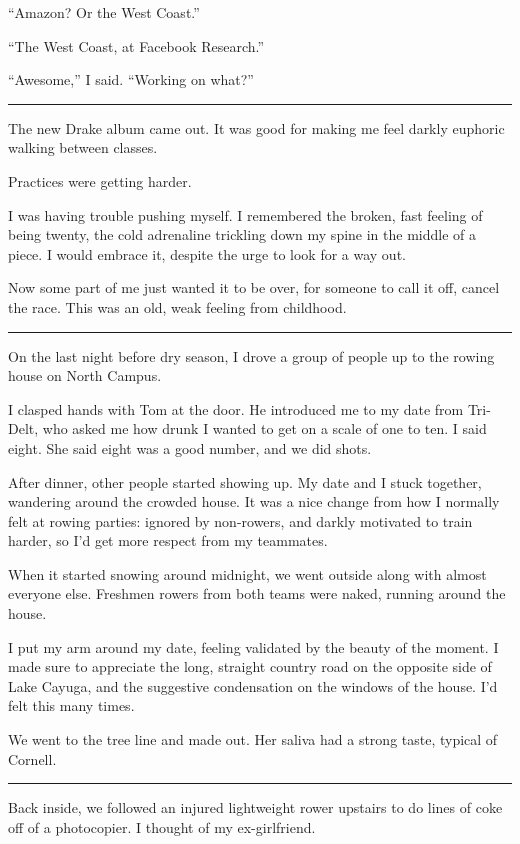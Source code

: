 ``Amazon?  Or the West Coast.''

``The West Coast, at Facebook Research.''

``Awesome,'' I said.  ``Working on what?''

\plainfancybreak{12pt}{2}{}

The new Drake album came out.  It was good for making me feel darkly euphoric
walking between classes.

Practices were getting harder.

I was having trouble pushing myself.  I remembered the broken, fast feeling of
being twenty, the cold adrenaline trickling down my spine in the middle of a
piece.  I would embrace it, despite the urge to look for a way out.  

Now some part of me just wanted it to be over, for someone to call it off,
cancel the race.  This was an old, weak feeling from childhood. 

\plainfancybreak{12pt}{2}{}

On the last night before dry season, I drove a group of people up to the rowing
house on North Campus.

I clasped hands with Tom at the door.  He introduced me to my date from
Tri-Delt, who asked me how drunk I wanted to get on a scale of one to ten. I
said eight.  She said eight was a good number, and we did shots.  

After dinner, other people started showing up.  My date and I stuck together,
wandering around the crowded house.  It was a nice change from how I normally
felt at rowing parties: ignored by non-rowers, and darkly motivated to train
harder, so I'd get more respect from my teammates.

When it started snowing around midnight, we went outside along with almost
everyone else.  Freshmen rowers from both teams were naked, running around the
house.

I put my arm around my date, feeling validated by the beauty of the moment.  I
made sure to appreciate the long, straight country road on the opposite side of
Lake Cayuga, and the suggestive condensation on the windows of the house.  I'd
felt this many times. 

We went to the tree line and made out.  Her saliva had a strong taste, typical
of Cornell.

\plainfancybreak{12pt}{2}{}

Back inside, we followed an injured lightweight rower upstairs to do lines of
coke off of a photocopier.  I thought of my ex-girlfriend.

